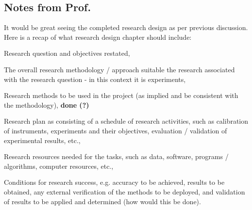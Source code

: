 \subsection{Notes from Prof.}
It would be great seeing the completed research design as per previous discussion.
Here is a recap of what research design chapter should include: 
\begin{todolist}
    \item[\done] Research question and objectives restated, 
    \item[\done] The overall research methodology / approach suitable the research associated with the research question - in this context it is experiments, 
    \item[\done] Research methods to be used in the project (as implied and be consistent with the methodology), \textbf{done (?)}
    \item[\done] Research plan as consisting of a schedule of research activities, such as calibration of instruments, experiments and their objectives, evaluation / validation of experimental results, etc., 
    \item[\done] Research resources needed for the tasks, such as data, software, programs / algorithms, computer resources, etc., 
    \item[\done] Conditions for research success, e.g. accuracy to be achieved, results to be obtained, any external verification of the methods to be deployed, and validation of results to be applied and determined (how would this be done).
\end{todolist}
